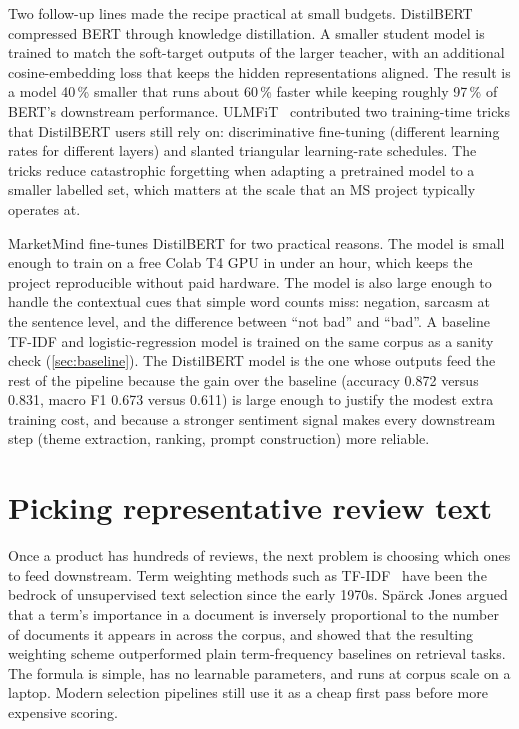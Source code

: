 \documentclass[12pt,a4paper]{report}
\begin{document}
Two follow-up lines made the recipe practical at small budgets. DistilBERT~\cite{sanh2019distilbert} compressed BERT through knowledge distillation. A smaller student model is trained to match the soft-target outputs of the larger teacher, with an additional cosine-embedding loss that keeps the hidden representations aligned. The result is a model 40\,\% smaller that runs about 60\,\% faster while keeping roughly 97\,\% of BERT's downstream performance. ULMFiT~\cite{howard2018ulmfit} contributed two training-time tricks that DistilBERT users still rely on: discriminative fine-tuning (different learning rates for different layers) and slanted triangular learning-rate schedules. The tricks reduce catastrophic forgetting when adapting a pretrained model to a smaller labelled set, which matters at the scale that an MS project typically operates at.

MarketMind fine-tunes DistilBERT for two practical reasons. The model is small enough to train on a free Colab T4 GPU in under an hour, which keeps the project reproducible without paid hardware. The model is also large enough to handle the contextual cues that simple word counts miss: negation, sarcasm at the sentence level, and the difference between ``not bad'' and ``bad''. A baseline TF-IDF and logistic-regression model is trained on the same corpus as a sanity check (\cref{sec:baseline}). The DistilBERT model is the one whose outputs feed the rest of the pipeline because the gain over the baseline (accuracy 0.872 versus 0.831, macro F1 0.673 versus 0.611) is large enough to justify the modest extra training cost, and because a stronger sentiment signal makes every downstream step (theme extraction, ranking, prompt construction) more reliable.

\section{Picking representative review text}
\label{sec:picking}

Once a product has hundreds of reviews, the next problem is choosing which ones to feed downstream. Term weighting methods such as TF-IDF~\cite{sparckjones1972tfidf} have been the bedrock of unsupervised text selection since the early 1970s. Sp\"arck Jones argued that a term's importance in a document is inversely proportional to the number of documents it appears in across the corpus, and showed that the resulting weighting scheme outperformed plain term-frequency baselines on retrieval tasks. The formula is simple, has no learnable parameters, and runs at corpus scale on a laptop. Modern selection pipelines still use it as a cheap first pass before more expensive scoring.
\end{document}
